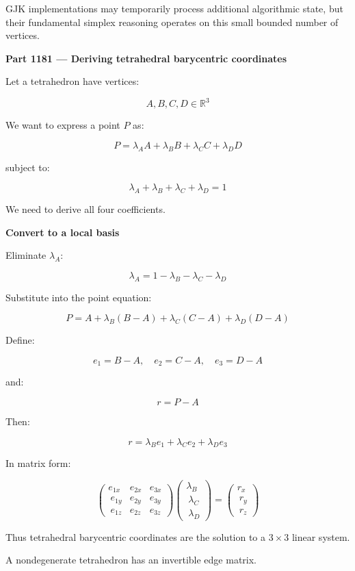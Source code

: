 GJK implementations may temporarily process additional algorithmic state, but their fundamental simplex reasoning operates on this small bounded number of vertices.

\textbf{Part 1181 --- Deriving tetrahedral barycentric coordinates}

Let a tetrahedron have vertices:

\[
A,B,C,D\in\mathbb R^3
\]

We want to express a point \(P\) as:

\[
\boxed{ P=\lambda_AA+\lambda_BB+\lambda_CC+\lambda_DD }
\]

subject to:

\[
\lambda_A+\lambda_B+\lambda_C+\lambda_D=1
\]

We need to derive all four coefficients.

\textbf{Convert to a local basis}

Eliminate \(\lambda_A\):

\[
\lambda_A=1-\lambda_B-\lambda_C-\lambda_D
\]

Substitute into the point equation:

\[
P=A+\lambda_B(B-A)+\lambda_C(C-A)+\lambda_D(D-A)
\]

Define:

\[
e_1=B-A,\quad e_2=C-A,\quad e_3=D-A
\]

and:

\[
r=P-A
\]

Then:

\[
\boxed{ r=\lambda_Be_1+\lambda_Ce_2+\lambda_De_3 }
\]

In matrix form:

\[
\begin{pmatrix} e_{1x}&e_{2x}&e_{3x}\\\ e_{1y}&e_{2y}&e_{3y}\\\ e_{1z}&e_{2z}&e_{3z} \end{pmatrix} \begin{pmatrix} \lambda_B\\\ \lambda_C\\\ \lambda_D \end{pmatrix} = \begin{pmatrix} r_x\\\ r_y\\\ r_z \end{pmatrix}
\]

Thus tetrahedral barycentric coordinates are the solution to a \(3\times3\) linear system.

A nondegenerate tetrahedron has an invertible edge matrix.

